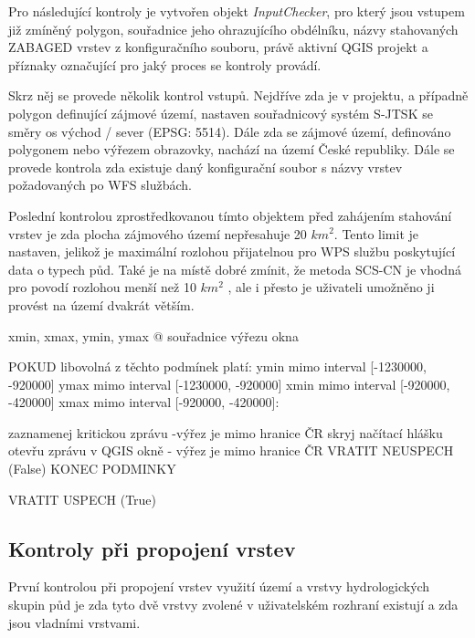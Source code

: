 \documentclass[a4paper,oneside,12pt]{book}
\begin{document}
\hspace{10mm} Pro následující kontroly je vytvořen objekt \textit{InputChecker}, pro který jsou vstupem již zmíněný polygon, souřadnice jeho ohrazujícího obdélníku, názvy stahovaných ZABAGED vrstev z konfiguračního souboru, právě aktivní QGIS projekt a příznaky označující pro jaký proces se kontroly provádí.

\hspace{10mm} Skrz něj se provede několik kontrol vstupů. Nejdříve zda je v projektu, a případně polygon definující zájmové území, nastaven souřadnicový systém S-JTSK se směry os východ / sever (EPSG: 5514). Dále zda se zájmové území, definováno polygonem nebo výřezem obrazovky, nachází na území České republiky. Dále se provede kontrola  zda existuje daný konfigurační soubor s názvy vrstev požadovaných po WFS službách. 

\hspace{10mm} Poslední kontrolou zprostředkovanou tímto objektem před zahájením stahování vrstev je zda plocha zájmového území nepřesahuje 20 $km^{2}$. Tento limit je nastaven, jelikož je maximální rozlohou přijatelnou pro WPS službu poskytující data o typech půd. Také je na místě dobré zmínit, že metoda SCS-CN je vhodná pro povodí rozlohou menší než 10 $km^{2}$ \cite{MNYDGwleJOjKdRUp}, ale i přesto je uživateli umožněno ji provést na území dvakrát větším.

\begin{pseudocode}[style=mypseudocode, caption={Ukázka kontroly umístění zájmového území v ČR},label={kod:CR_check}]
    xmin, xmax, ymin, ymax @ souřadnice výřezu okna
    
    POKUD libovolná z těchto podmínek platí:
         ymin mimo interval [-1230000, -920000]  
         ymax mimo interval [-1230000, -920000]  
         xmin mimo interval [-920000, -420000]  
         xmax mimo interval [-920000, -420000]:
            
            zaznamenej kritickou zprávu -výřez je mimo hranice ČR
            skryj načítací hlášku
            otevřu zprávu v QGIS okně - výřez je mimo hranice ČR
            VRATIT NEUSPECH (False)
    KONEC PODMINKY
    
    VRATIT USPECH (True)
\end{pseudocode}

\subsection{Kontroly při propojení vrstev} \label{intersection_checks}
\hspace{10mm}  První kontrolou při propojení vrstev využití území a vrstvy hydrologických skupin půd je zda tyto dvě vrstvy zvolené v uživatelském rozhraní existují a zda jsou vladními vrstvami.
\end{document}
